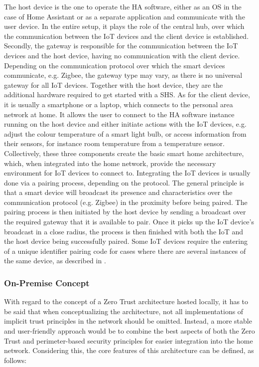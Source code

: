 The host device is the one to operate the HA software, either as an OS in the case of Home Assistant\cite{home_assistant} or as a separate application and communicate with the user device. In the entire setup, it plays the role of the central hub, over which the communication between the IoT devices and the client device is established. Secondly, the gateway is responsible for the communication between the IoT devices and the host device, having no communication with the client device. Depending on the communication protocol over which the smart devices communicate, e.g. Zigbee, the gateway type may vary, as there is no universal gateway for all IoT devices. Together with the host device, they are the additional hardware required to get started with a SHS. As for the client device, it is usually a smartphone or a laptop, which connects to the personal area network at home. It allows the user to connect to the HA software instance running on the host device and either initiate actions with the IoT devices, e.g. adjust the colour temperature of a smart light bulb, or access information from their sensors, for instance room temperature from a temperature sensor.\\
Collectively, these three components create the basic smart home architecture, which, when integrated into the home network, provide the necessary environment for IoT devices to connect to. Integrating the IoT devices is usually done via a pairing process, depending on the protocol. The general principle is that a smart device will broadcast its presence and characteristics over the communication protocol (e.g. Zigbee) in the proximity before being paired. The pairing process is then initiated by the host device by sending a broadcast over the required gateway that it is available to pair. Once it picks up the IoT device's broadcast in a close radius, the process is then finished with both the IoT and the host device being successfully paired. Some IoT devices require the entering of a unique identifier pairing code for cases where there are several instances of the same device, as described in \cite{ha_homekit_bridge}.

\subsubsection{On-Premise Concept}
With regard to the concept of a Zero Trust architecture hosted locally, it has to be said that when conceptualizing the architecture, not all implementations of implicit trust principles in the network should be omitted. Instead, a more stable and user-friendly approach would be to combine the best aspects of both the Zero Trust and perimeter-based security principles for easier integration into the home network. Considering this, the core features of this architecture can be defined, as follows:

